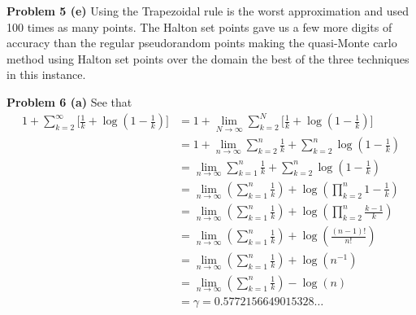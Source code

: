 \documentclass[12pt]{article}
\newcommand{\problem}[1]{\hspace{-4 ex} \large \textbf{Problem #1} }
\begin{document}
\bigbreak
\problem{5 (e)} Using the Trapezoidal rule is the worst approximation and used 100 times as many points. The Halton set points gave us a few more digits of accuracy than the regular pseudorandom points making the quasi-Monte carlo method using Halton set points over the domain the best of the three techniques in this instance. 
	
\bigbreak
\problem{6 (a)} See that
\begin{align*}
	1 + \sum_{k=2}^\infty \Big [ \tfrac{1}{k} + \log(1-\tfrac{1}{k}) \Big] & = 1 + \lim_{N \to \infty} \sum_{k=2}^N \Big [ \tfrac{1}{k} + \log(1-\tfrac{1}{k}) \Big] \\
	& = 1 + \lim_{n \to \infty} \sum_{k=2}^n \tfrac{1}{k} + \sum_{k=2}^n \log(1-\tfrac{1}{k}) \\
	& = \lim_{n \to \infty} \sum_{k=1}^n \tfrac{1}{k} + \sum_{k=2}^n \log(1-\tfrac{1}{k}) \\
	& = \lim_{n \to \infty} \left( \sum_{k=1}^n \tfrac{1}{k} \right) + \log \left( \prod_{k=2}^n 1-\tfrac{1}{k} \right) \\
	& = \lim_{n \to \infty} \left( \sum_{k=1}^n \tfrac{1}{k} \right) + \log \left( \prod_{k=2}^n \tfrac{k-1}{k} \right) \\
	& = \lim_{n \to \infty} \left( \sum_{k=1}^n \tfrac{1}{k} \right) + \log \left( \frac{(n-1)!}{n!} \right) \\
	& = \lim_{n \to \infty} \left( \sum_{k=1}^n \tfrac{1}{k} \right) + \log \left( n^{-1} \right) \\
	& = \lim_{n \to \infty} \left( \sum_{k=1}^n \tfrac{1}{k} \right) - \log \left( n \right) \\
	& = \gamma = 0.5772156649015328\dots
\end{align*}
\end{document}
